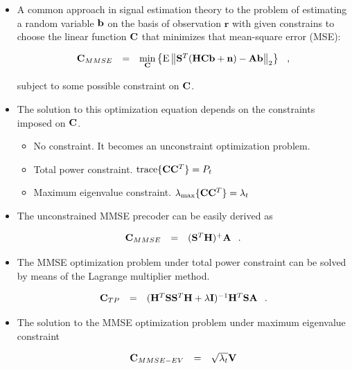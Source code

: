 \documentclass[20pt,landscape]{foils}
\newcommand{\br}{{\mathbf r}}
\newcommand{\bA}{{\mathbf A}}
\newcommand{\bb}{{\bf b}}
\newcommand{\bC}{{\bf C}}
\newcommand{\bn}{{\bf n}}
\newcommand{\bH}{{\bf H}}
\newcommand{\bS}{{\bf S}}
\newcommand{\bI}{{\bf I}}
\newcommand{\bV}{{\bf V}}
\begin{document}
\begin{itemize}
\item A common approach in signal estimation theory to the problem
of estimating a random variable $\bb$ on the basis of observation
$\br$ with given constrains to choose the linear function $\bC$
that minimizes that mean-square error (MSE):

$$\begin{array}{rcl}
\bC_{MMSE}&=&\min\limits_{\bC}\left\{\mbox{E}\left\|\bS^T(\bH\bC\bb+\bn)-\bA\bb\right\|_2\right\}\hspace{0.1in},
\end{array}\label{MSE}$$

\noindent subject to some possible constraint on $\bC$.

\item The solution to this optimization equation depends on the
constraints imposed on $\bC$.
    \begin{itemize}
    \item No constraint. It becomes an unconstraint optimization
    problem.
    \item Total power constraint. $\mbox{trace}\{\bC\bC^T\}=P_t$
    \item Maximum eigenvalue constraint. $\lambda_{\max}\{\bC\bC^T\}=\lambda_t$
    \end{itemize}
\end{itemize}

\begin{itemize}
\item The unconstrained MMSE precoder can be easily derived as

$$
\begin{array}{rcl}
\bC_{MMSE}&=&(\bS^T\bH)^{+}\bA\hspace{0.1in}.
\end{array}\label{UMMSE}
$$

\item The MMSE optimization problem under total power constraint
can be solved by means of the Lagrange multiplier method.

$$\begin{array}{rcl}
\bC_{TP}&=&(\bH^T\bS\bS^T\bH+\lambda\bI)^{-1}\bH^T\bS\bA\hspace{0.1in}.
\end{array}$$

\item The solution to the MMSE optimization problem under maximum
eigenvalue constraint

$$\begin{array}{rcl}
\bC_{MMSE-EV}&=&\sqrt{\lambda_t}\bV
\end{array}\label{C-MMSEEV}$$

\end{itemize}
\end{document}
